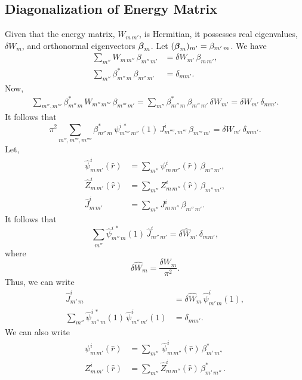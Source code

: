 \documentclass[12pt,prb,aps,notitlepage]{revtex4-1}
\newcommand{\bbeta}{\mbox{\boldmath$\beta$}}
\begin{document}
\subsection{Diagonalization of Energy Matrix}
Given that the energy matrix, $W_{m\,m'}$, is Hermitian, it possesses real eigenvalues, $\delta W_m$, and orthonormal
eigenvectors $\bbeta_m$. Let $(\bbeta_m)_{m'} = \beta_{m'\,m}$. 
We have
\begin{align}
\sum_{m''} W_{m\,m''}\,\beta_{m''\,m'} &= \delta W_{m'}\,\beta_{m\,m'},\\[0.5ex]
\sum_{m''} \beta_{m''\,m}^\ast\,\beta_{m''\,m'} &= \delta_{mm'}.
\end{align}
Now,
\begin{align}
\sum_{m'',m'''}\beta^\ast_{m''\,m}\,W_{m''\,m'''}\,\beta_{m'''\,m'} = \sum_{m''} \beta^\ast_{m''\,m}\,\beta_{m''\,m'}\,\delta W_{m'}=\delta W_{m'}\,\delta_{mm'}.
\end{align}
It follows that
\begin{equation}
\pi^2\sum_{m'',m''',m''''}\beta^\ast_{m''\,m}\,\psi^{i\,\ast}_{m''''\,m''}(1)\,J^i_{m'''',m'''}\,\beta_{m'''\,m'} = \delta W_{m'}\,\delta_{mm'}.
\end{equation}
Let,
\begin{align}
\hat{\psi}^i_{m\,m'}(\hat{r}) &= \sum_{m''}\psi^i_{m\,m''}(\hat{r})\,\beta_{m''\,m'},\\[0.5ex]
\hat{Z}^i_{m\,m'}(\hat{r}) &= \sum_{m''}Z^i_{m\,m''}(\hat{r})\,\beta_{m''\,m'},\\[0.5ex]
\hat{J}^i_{m\,m'} &= \sum_{m''}J^i_{m\,m''}\,\beta_{m''\,m'}.
\end{align}
It follows that
\begin{equation}
\sum_{m''} \hat{\psi}^{i\,\ast}_{m''\,m}(1)\,\hat{J}^i_{m''\,m'} = \delta\hat{W}_{m'}\,\delta_{mm'},
\end{equation}
where
\begin{equation}
\delta\hat{W}_m = \frac{\delta W_m}{\pi^2}.
\end{equation}
Thus, we can write
\begin{align}
\hat{J}^i_{m'\,m} &= \delta\hat{W}_m\,\hat{\psi}^i_{m'\,m}(1),\\[0.5ex]
\sum_{m'' }\hat{\psi}^{i\,\ast}_{m''\,m}(1)\,\hat{\psi}^i_{m''\,m'}(1)&=\delta_{mm'}.
\end{align}
We can also write
\begin{align}
\psi^i_{m\,m'}(\hat{r}) &= \sum_{m''}\,\hat{\psi}^i_{m\,m''}(\hat{r})\,\beta_{m'\,m''}^\ast\,\\[0.5ex]
Z^i_{m\,m'}(\hat{r}) &= \sum_{m''}\hat{Z}^i_{m\,m''}(\hat{r})\,\beta_{m'\,m''}^\ast\,. 
\end{align}
\end{document}
